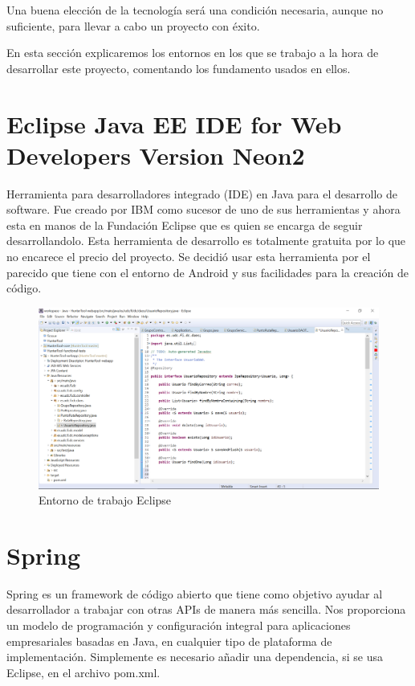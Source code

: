 
Una buena elección de la tecnología será una condición necesaria, aunque no suficiente, para llevar a cabo un proyecto con éxito.

En esta sección explicaremos los entornos en los que se trabajo a la hora de desarrollar este proyecto, comentando los fundamento usados en ellos. 

\section{Eclipse Java EE IDE for Web Developers Version Neon2 }
Herramienta para desarrolladores  integrado (IDE)  en Java para el desarrollo de software. Fue creado por IBM como sucesor de uno de sus herramientas y ahora esta en manos de la Fundación Eclipse que es quien se encarga de seguir desarrollandolo.
 Esta herramienta de desarrollo es totalmente gratuita por lo que no encarece el precio del proyecto. Se decidió usar esta herramienta por el parecido que tiene con el entorno de Android y sus facilidades para la creación de código.
\begin{figure}
		\centering
		\includegraphics[width=\textwidth] {eclipse.png}
		\caption{Entorno de trabajo Eclipse }
		\label{fig:eclipse}
	\end{figure}
	
	
	
\section{Spring}
Spring es un framework de código abierto que tiene como objetivo ayudar al desarrollador a trabajar con otras APIs de manera más sencilla. Nos proporciona un modelo de programación y configuración integral para aplicaciones empresariales basadas en Java, en cualquier tipo de plataforma de implementación. Simplemente es necesario añadir una dependencia, si se usa Eclipse, en el archivo pom.xml. 

